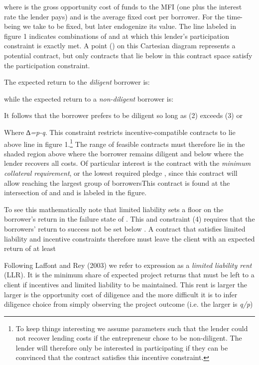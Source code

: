 \documentclass{article}
\begin{document}
where is the gross opportunity cost of funds to the MFI (one plus the
interest rate the lender pays) and is the average fixed cost per
borrower. For the time-being we take to be fixed, but later endogenize
its value. The line labeled in figure 1 indicates combinations of and at
which this lender's participation constraint is exactly met. A point ()
on this Cartesian diagram represents a potential contract, but only
contracts that lie below in this contract space satisfy the
participation constraint.

The expected return to the \emph{diligent} borrower is:

while the expected return to a \emph{non-diligent} borrower is:

It follows that the borrower prefers to be diligent so long as (2)
exceeds (3) or


Where ∆\emph{=p-q}. This constraint restricts incentive-compatible
contracts to lie above line in figure 1.\footnote{To keep things
  interesting we assume parameters such that the lender could not
  recover lending costs if the entrepreneur chose to be non-diligent.
  The lender will therefore only be interested in participating if they
  can be convinced that the contract satisfies this incentive
  constraint.} The range of feasible contracts must therefore lie in the
shaded region above where the borrower remains diligent and below where
the lender recovers all costs. Of particular interest is the contract
with the \emph{minimum collateral requirement}, or the lowest required
pledge , since this contract will allow reaching the largest group of
borrowersThis contract is found at the intersection of and and is
labeled in the figure.

To see this mathematically note that limited liability sets a floor on
the borrower's return in the failure state of . This and constraint (4)
requires that the borrowers' return to success not be set below . A
contract that satisfies limited liability and incentive constraints
therefore must leave the client with an expected return of at least

Following Laffont and Rey (2003) we refer to expression as a
\emph{limited liability rent} (LLR). It is the minimum share of expected
project returns that must be left to a client if incentives and limited
liability to be maintained. This rent is larger the larger is the
opportunity cost of diligence and the more difficult it is to infer
diligence choice from simply observing the project outcome (i.e. the
larger is \emph{q/p})
\end{document}
